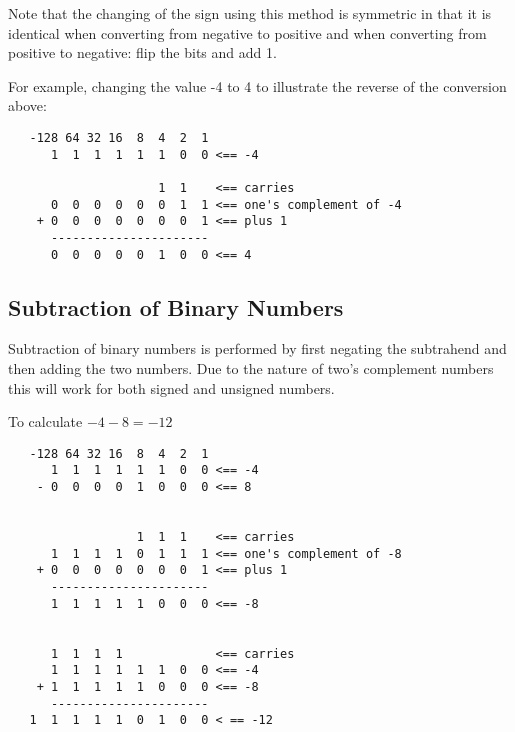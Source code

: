 Note that the changing of the sign using this method is symmetric
in that it is identical when converting from negative to positive
and when converting from positive to negative: flip the bits and
add 1.

For example, changing the value -4 to 4 to illustrate the
reverse of the conversion above:

\begin{verbatim}
   -128 64 32 16  8  4  2  1
      1  1  1  1  1  1  0  0 <== -4

                     1  1    <== carries
      0  0  0  0  0  0  1  1 <== one's complement of -4
    + 0  0  0  0  0  0  0  1 <== plus 1
      ----------------------
      0  0  0  0  0  1  0  0 <== 4
\end{verbatim}

\subsection{Subtraction of Binary Numbers}


Subtraction of binary numbers is performed by first negating
the subtrahend and then adding the two numbers.  Due to the
nature of two's complement numbers this will work for both 
signed and unsigned numbers.

To calculate $-4-8 = -12$

\begin{verbatim}
   -128 64 32 16  8  4  2  1
      1  1  1  1  1  1  0  0 <== -4
    - 0  0  0  0  1  0  0  0 <== 8


                  1  1  1    <== carries
      1  1  1  1  0  1  1  1 <== one's complement of -8
    + 0  0  0  0  0  0  0  1 <== plus 1
      ----------------------
      1  1  1  1  1  0  0  0 <== -8
      
	  
      1  1  1  1             <== carries
      1  1  1  1  1  1  0  0 <== -4
    + 1  1  1  1  1  0  0  0 <== -8
      ----------------------
   1  1  1  1  1  0  1  0  0 < == -12
\end{verbatim}


